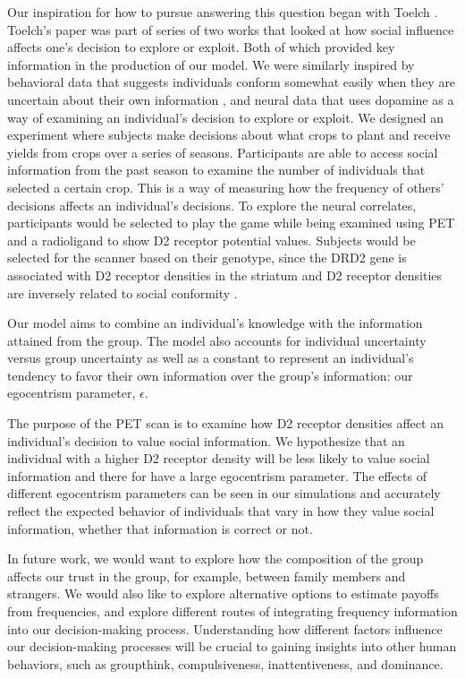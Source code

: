 \documentclass[11pt, a4paper]{article}
\begin{document}
Our inspiration for how to pursue answering this question began with Toelch \cite{Toelch2013}. Toelch's paper was part of series of two works that looked at how social influence affects one's decision to explore or exploit. Both of which provided key information in the production of our model. We were similarly inspired by behavioral data that suggests individuals conform somewhat easily when they are uncertain about their own information \cite{Lorenz2011}, and neural data that uses dopamine as a way of examining an individual's decision to explore or exploit. We designed an experiment where subjects make decisions about what crops to plant and receive yields from crops over a series of seasons. Participants are able to access social information from the past season to examine the number of individuals that selected a certain crop. This is a way of measuring how the frequency of others' decisions affects an individual's decisions. To explore the neural correlates, participants would be selected to play the game while being examined using PET and a radioligand to show D2 receptor potential values. Subjects would be selected for the scanner based on their genotype, since the DRD2 gene is associated with D2 receptor densities in the striatum \cite{Frank2009} and D2 receptor densities are inversely related to social conformity \cite{Lorenz2011}.

Our model aims to combine an individual's knowledge with the information attained from the group. The model also accounts for individual uncertainty versus group uncertainty as well as a constant to represent an individual's tendency to favor their own information over the group's information: our egocentrism parameter, $\epsilon$. 

The purpose of the PET scan is to examine how D2 receptor densities affect an individual's decision to value social information. We hypothesize that an individual with a higher D2 receptor density will be less likely to value social information and there for have a large egocentrism parameter. The effects of different egocentrism parameters can be seen in our simulations and accurately reflect the expected behavior of individuals that vary in how they value social information, whether that information is correct or not. 

In future work, we would want to explore how the composition of the group affects our trust in the group, for example, between family members and strangers. We would also like to explore alternative options to estimate payoffs from frequencies, and explore different routes of integrating frequency information into our decision-making process. Understanding how different factors influence our decision-making processes will be crucial to gaining insights into other human behaviors, such as groupthink, compulsiveness, inattentiveness, and dominance.

\newpage

\nocite{*}


\end{document}
